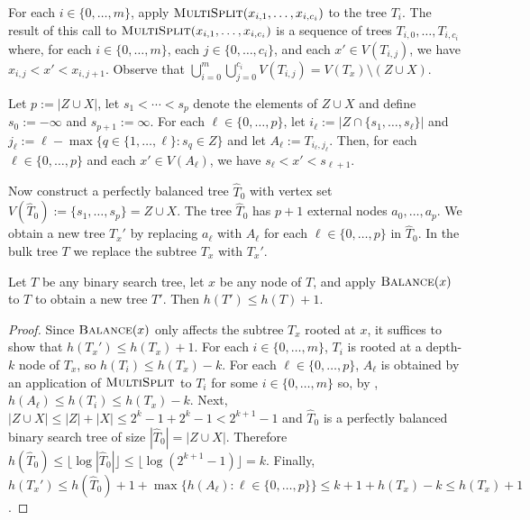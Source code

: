 \documentclass[kpfonts]{patmorin}
\let\le\leqslant
\begin{document}
For each $i\in\{0,\ldots,m\}$, apply $\textsc{MultiSplit}(x_{i,1},\ldots,x_{i,c_i})$ to the tree $T_i$.  The result of this call to $\textsc{MultiSplit}(x_{i,1},\ldots,x_{i,c_i})$ is a sequence of trees $T_{i,0},\ldots,T_{i,c_i}$ where, for each $i\in\{0,\ldots,m\}$, each $j\in\{0,\ldots,c_i\}$, and each $x'\in V(T_{i,j})$, we have $x_{i,j}<x'<x_{i,j+1}$.  Observe that $\bigcup_{i=0}^m\bigcup_{j=0}^{c_i} V(T_{i,j}) = V(T_x)\setminus (Z\cup X)$.

Let $p:=|Z\cup X|$, let $s_1<\cdots< s_p$ denote the elements of $Z\cup X$ and define $s_0:=-\infty$ and $s_{p+1}:=\infty$.  For each $\ell\in\{0,\ldots,p\}$, let $i_\ell:=|Z\cap \{s_1,\ldots,s_\ell\}|$ and $j_\ell:= \ell - \max\{ q\in\{1,\ldots,\ell\}: s_q\in Z\}$ and let $A_\ell:=T_{i_\ell,j_\ell}$.   Then, for each $\ell\in \{0,\ldots,p\}$ and each $x'\in V(A_\ell)$, we have $s_\ell < x' < s_{\ell+1}$.

Now construct a perfectly balanced tree $\hat{T}_0$ with vertex set $V(\hat{T}_0):=\{s_1,\ldots,s_p\}=Z\cup X$.  The tree $\hat{T}_0$ has $p+1$ external nodes $a_0,\ldots,a_p$.  We obtain a new tree $T_x'$ by replacing $a_\ell$ with $A_\ell$ for each $\ell\in\{0,\ldots,p\}$ in $\hat{T}_0$.  In the bulk tree $T$ we replace the subtree $T_x$ with $T_x'$.

\begin{lem}
  Let $T$ be any binary search tree, let $x$ be any node of $T$, and apply $\textsc{Balance}(x)$ to $T$ to obtain a new tree $T'$.  Then $h(T')\le h(T)+1$.
\end{lem}

\begin{proof}
  Since $\textsc{Balance}(x)$ only affects the subtree $T_x$ rooted at $x$, it suffices to show that $h(T_x')\le h(T_x)+1$.  For each $i\in\{0,\ldots, m\}$, $T_i$ is rooted at a depth-$k$ node of $T_x$, so $h(T_i)\le h(T_x)-k$. For each $\ell \in\{0,\ldots,p\}$, $A_\ell$ is obtained by an application of $\textsc{MultiSplit}$ to $T_i$ for some $i\in\{0,\ldots,m\}$ so, by , $h(A_\ell)\le h(T_i)\le h(T_x)-k$.  Next, $|Z\cup X|\le |Z|+|X| \le 2^k-1 + 2^k-1 < 2^{k+1}-1$ and $\hat{T}_0$ is a perfectly balanced binary search tree of size $|\hat{T}_0|=|Z\cup X|$.  Therefore $h(\hat{T}_0)\le \lfloor\log|\hat{T}_0|\rfloor\le \lfloor\log(2^{k+1}-1)\rfloor = k$.  Finally, $h(T_x')\le h(\hat{T}_0)+1 +\max \{h(A_\ell):\ell\in\{0,\ldots,p\}\} \le k +1 + h(T_x) - k\le h(T_x)+1$.  
\end{proof}
\end{document}
